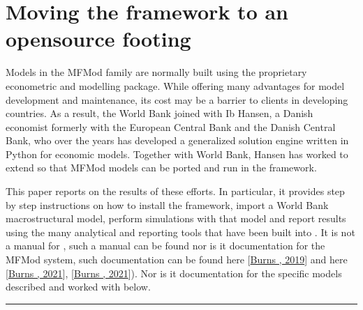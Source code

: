 \documentclass[letterpaper,10pt,english]{jupyterBook}
\begin{document}
\section{Moving the framework to an open\sphinxhyphen{}source footing}
\label{\detokenize{content/01_Introduction/Introduction:moving-the-framework-to-an-open-source-footing}}
\sphinxAtStartPar
Models in the MFMod family are normally built using the proprietary  econometric and modelling package. While offering many advantages for model development and maintenance, its cost may be a barrier to clients in developing countries.  As a result, the World Bank joined with Ib Hansen, a Danish economist formerly with the European Central Bank and the Danish Central Bank, who over the years has developed  a generalized solution engine written in Python for economic models. Together with World Bank, Hansen has worked to extend  so that MFMod models can be ported and run in the framework.

\sphinxAtStartPar
This paper reports on the results of these efforts. In particular, it provides step by step instructions on how to install the  framework, import a World Bank macrostructural model,  perform simulations with that model and report results using the many analytical and reporting tools that have been built into .  It is not a manual for , such a manual can be found  nor is it documentation for the MFMod system, such documentation can be found here {[}\hyperlink{cite.content/99_BackMatter/References:id15}{Burns , 2019}{]} and here {[}\hyperlink{cite.content/99_BackMatter/References:id18}{Burns , 2021}{]}, {[}\hyperlink{cite.content/99_BackMatter/References:id14}{Burns , 2021}{]}). Nor is it documentation for the specific models described and worked with below.


\bigskip\hrule\bigskip


\sphinxstepscope
\end{document}
